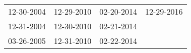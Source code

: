 \begin{supertabular}{llll}
 12-30-2004 &  12-29-2010 &  02-20-2014 &  12-29-2016 \\
 12-31-2004 &  12-30-2010 &  02-21-2014 &             \\
 03-26-2005 &  12-31-2010 &  02-22-2014 &             \\
\end{supertabular}

